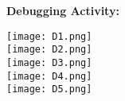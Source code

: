 \documentclass[11]{article}
\begin{document}
\newpage
\textbf{Debugging Activity:} \vspace{1cm}

\texttt{[image: D1.png]}\\  \vspace{1cm}\texttt{[image: D2.png]}\\  \vspace{1cm}\texttt{[image: D3.png]}\\  \vspace{1cm} \texttt{[image: D4.png]}\\  \vspace{1cm} 
\texttt{[image: D5.png]}\\  \vspace{1cm}
 
\end{document}

